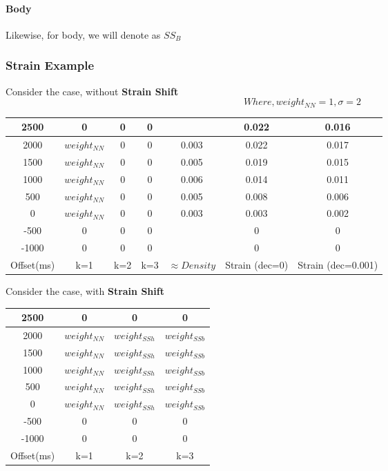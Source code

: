 \paragraph{Body} Likewise, for body, we will denote as $SS_B$

\subsubsection{Strain Example}

Consider the case, without \textbf{Strain Shift}
$$ Where, weight_{NN} = 1, \sigma = 2 $$
\begin{center}
	\begin{tabular}{|c|c|c|c|c|c|c|} 
	\hline
	2500 & 0 			& 0 & 0 &       & 0.022 & 0.016\\ \hline
	2000 & $weight_{NN}$& 0 & 0 & 0.003 & 0.022 & 0.017\\	\hline
	1500 & $weight_{NN}$& 0 & 0 & 0.005 & 0.019 & 0.015\\	\hline
	1000 & $weight_{NN}$& 0 & 0 & 0.006 & 0.014 & 0.011\\	\hline
	 500 & $weight_{NN}$& 0 & 0 & 0.005 & 0.008 & 0.006\\	\hline
	   0 & $weight_{NN}$& 0 & 0 & 0.003 & 0.003 & 0.002\\	\hline
    -500 & 0 			& 0 & 0 & 		& 0	 	& 0	\\	\hline
   -1000 & 0 			& 0 & 0 & 		& 0	 	& 0	\\
	\hline
	Offset(ms) & k=1 & k=2 & k=3 & $\approx Density$ & Strain (dec=0) & Strain (dec=0.001) \\ 
	\hline
\end{tabular}
\end{center}

Consider the case, with \textbf{Strain Shift}
\begin{center}
	\begin{tabular}{|c|c|c|c|} 
	\hline
	2500 & 0			  & 0 		& 0 	\\ \hline
	2000 & $weight_{NN}$  & $weight_{SSh}$ 	& $weight_{SSb}$\\	\hline
	1500 & $weight_{NN}$  & $weight_{SSh}$ 	& $weight_{SSb}$\\	\hline
	1000 & $weight_{NN}$  & $weight_{SSh}$ 	& $weight_{SSb}$\\	\hline
	 500 & $weight_{NN}$  & $weight_{SSh}$ 	& $weight_{SSb}$\\	\hline
	   0 & $weight_{NN}$  & $weight_{SSh}$ 	& $weight_{SSb}$\\	\hline
    -500 & 0			  & 0 		& 0 	\\	\hline
   -1000 & 0			  & 0 		& 0 	\\
	\hline
	Offset(ms) & k=1 & k=2 & k=3\\ 
	\hline
\end{tabular}
\end{center}

